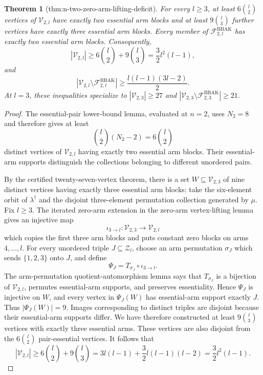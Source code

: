\documentclass{article}
\newtheorem{theorem}{Theorem}
\begin{document}
\begin{theorem}[thm:n-two-zero-arm-lifting-deficit]\label{thm:n-two-zero-arm-lifting-deficit}
For every \(l\ge3\), at least \(6\binom l2\) vertices of \(\mathcal V_{2,l}\) have exactly two essential arm blocks and at least \(9\binom l3\) further vertices have exactly three essential arm blocks. Every member of \(\mathcal F^{\mathrm{BBAK}}_{2,l}\) has exactly two essential arm blocks. Consequently,
\[|\mathcal V_{2,l}|\ge6\binom l2+9\binom l3=\frac32l^2(l-1),\]
and
\[|\mathcal V_{2,l}\setminus\mathcal F^{\mathrm{BBAK}}_{2,l}|\ge\frac{l(l-1)(3l-2)}2.\]
At \(l=3\), these inequalities specialize to \(|\mathcal V_{2,3}|\ge27\) and \(|\mathcal V_{2,3}\setminus\mathcal F^{\mathrm{BBAK}}_{2,3}|\ge21\).
\end{theorem}
\begin{proof}
The essential-pair lower-bound lemma, evaluated at \(n=2\), uses \(N_2=8\) and therefore gives at least
\[
\binom l2(N_2-2)=6\binom l2
\]
distinct vertices of \(\mathcal V_{2,l}\) having exactly two essential arm blocks. Their essential-arm supports distinguish the collections belonging to different unordered pairs.

By the certified twenty-seven-vertex theorem, there is a set \(W\subseteq\mathcal V_{2,3}\) of nine distinct vertices having exactly three essential arm blocks: take the six-element orbit of \(\lambda^\dagger\) and the disjoint three-element permutation collection generated by \(\mu\). Fix \(l\ge3\). The iterated zero-arm extension in the zero-arm vertex-lifting lemma gives an injective map
\[
\iota_{3\to l}:\mathcal V_{2,3}\longrightarrow\mathcal V_{2,l}
\]
which copies the first three arm blocks and puts constant zero blocks on arms \(4,\ldots,l\). For every unordered triple \(J\subseteq\mathcal Z_l\), choose an arm permutation \(\sigma_J\) which sends \(\{1,2,3\}\) onto \(J\), and define
\[
\Psi_J=T_{\sigma_J}\circ\iota_{3\to l}.
\]
The arm-permutation quotient-automorphism lemma says that \(T_{\sigma_J}\) is a bijection of \(\mathcal V_{2,l}\), permutes essential-arm supports, and preserves essentiality. Hence \(\Psi_J\) is injective on \(W\), and every vertex in \(\Psi_J(W)\) has essential-arm support exactly \(J\). Thus \(|\Psi_J(W)|=9\). Images corresponding to distinct triples are disjoint because their essential-arm supports differ. We have therefore constructed at least \(9\binom l3\) vertices with exactly three essential arms. These vertices are also disjoint from the \(6\binom l2\) pair-essential vertices. It follows that
\[
|\mathcal V_{2,l}|\ge6\binom l2+9\binom l3
=3l(l-1)+\frac32l(l-1)(l-2)
=\frac32l^2(l-1).
\]


\end{proof}
\end{document}
